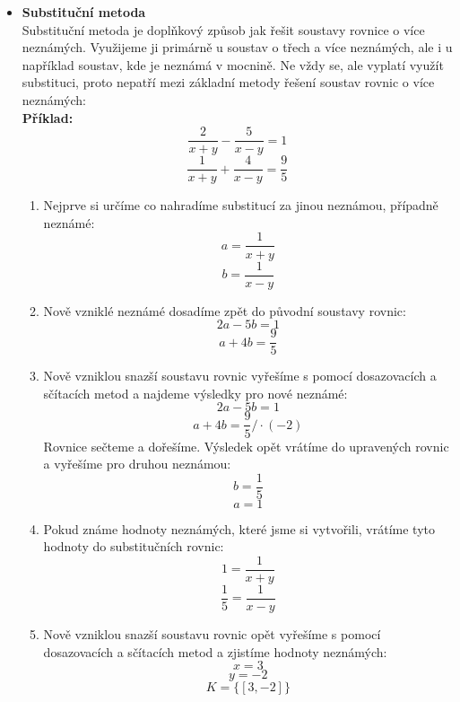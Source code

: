 \begin{itemize}
    \item \textbf{Substituční metoda}\\
        Substituční metoda je doplňkový způsob jak řešit soustavy rovnice o více neznámých. Využijeme ji primárně u soustav o třech a více neznámých, ale i u například soustav, kde je neznámá v mocnině. Ne vždy se, ale vyplatí využít substituci, proto nepatří mezi základní metody řešení soustav rovnic o více neznámých:\\
        \textbf{Příklad:}
        $$
        \frac{2}{x+y}-\frac{5}{x-y}=1
        $$
        $$
        \frac{1}{x+y}+\frac{4}{x-y}=\frac{9}{5}
        $$
        \begin{enumerate}
            \item Nejprve si určíme co nahradíme substitucí za jinou neznámou, případně neznámé:
                $$
                a=\frac{1}{x+y}    
                $$
                $$
                b=\frac{1}{x-y}
                $$
            \item Nově vzniklé neznámé dosadíme zpět do původní soustavy rovnic:
                $$
                2a-5b=1
                $$
                $$
                a+4b=\frac{9}{5}
                $$
            \item Nově vzniklou snazší soustavu rovnic vyřešíme s pomocí dosazovacích a sčítacích metod a najdeme výsledky pro nové neznámé:
                $$
                2a-5b=1
                $$
                $$
                a+4b=\frac{9}{5}/\cdot(-2)
                $$
                Rovnice sečteme a dořešíme. Výsledek opět vrátíme do upravených rovnic a vyřešíme pro druhou neznámou:
                $$
                b=\frac{1}{5}
                $$
                $$
                a=1
                $$
            \item Pokud známe hodnoty neznámých, které jsme si vytvořili, vrátíme tyto hodnoty do substitučních rovnic:
                $$
                1=\frac{1}{x+y}
                $$
                $$
                \frac{1}{5}=\frac{1}{x-y}
                $$
            \item Nově vzniklou snazší soustavu rovnic opět vyřešíme s pomocí dosazovacích a sčítacích metod a zjistíme hodnoty neznámých:
            $$
            x=3
            $$
            $$
            y=-2
            $$
            $$
            K=\{[3,-2]\}
            $$
        \end{enumerate}
\end{itemize}

